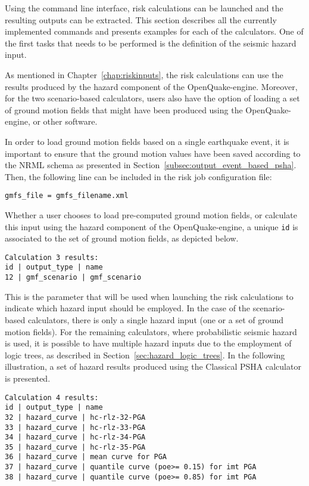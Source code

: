 Using the command line interface, risk calculations can be launched and the
resulting outputs can be extracted. This section describes all the currently
implemented commands and presents examples for each of the calculators. One of
the first tasks that needs to be performed is the definition of the seismic
hazard input.

As mentioned in Chapter~\ref{chap:riskinputs}, the risk calculations can use
the results produced by the hazard component of the OpenQuake-engine.
Moreover, for the two scenario-based calculators, users also have the option
of loading a set of ground motion fields that might have been produced using
the OpenQuake-engine, or other software.

In order to load ground motion fields based on a single earthquake event, it
is important to ensure that the ground motion values have been saved
according to the NRML schema as presented in
Section~\ref{subsec:output_event_based_psha}. Then, the following line can be
included in the risk job configuration file:

\begin{Verbatim}[frame=single, commandchars=\\\{\}, samepage=true]
gmfs_file = gmfs_filename.xml
\end{Verbatim}

Whether a user chooses to load pre-computed ground motion fields, or calculate
this input using the hazard component of the OpenQuake-engine, a unique
\verb+id+ is associated to the set of ground motion fields, as depicted below.

\begin{Verbatim}[frame=single, commandchars=\\\{\}, samepage=true]
Calculation 3 results:
id | output_type | name
12 | gmf_scenario | gmf_scenario
\end{Verbatim}

This is the parameter that will be used when launching the risk calculations
to indicate which hazard input should be employed. In the case of the
scenario-based calculators, there is only a single hazard input (one or a set
of ground motion fields). For the remaining calculators, where probabilistic
seismic hazard is used, it is possible to have multiple hazard inputs due to
the employment of logic trees, as described in
Section~\ref{sec:hazard_logic_trees}. In the following illustration, a set of
hazard results produced using the Classical PSHA calculator is presented.

\begin{Verbatim}[frame=single, commandchars=\\\{\}, samepage=true]
Calculation 4 results:
id | output_type | name
32 | hazard_curve | hc-rlz-32-PGA
33 | hazard_curve | hc-rlz-33-PGA
34 | hazard_curve | hc-rlz-34-PGA
35 | hazard_curve | hc-rlz-35-PGA
36 | hazard_curve | mean curve for PGA
37 | hazard_curve | quantile curve (poe>= 0.15) for imt PGA
38 | hazard_curve | quantile curve (poe>= 0.85) for imt PGA
\end{Verbatim}

